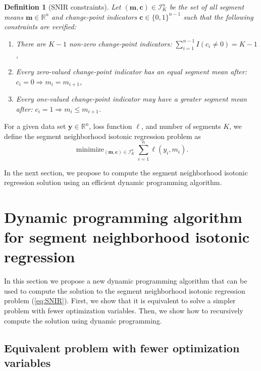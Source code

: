 \documentclass{article}
\newtheorem{definition}{Definition}
\DeclareMathOperator*{\minimize}{minimize}
\newcommand{\RR}{\mathbb R}
\begin{document}
\begin{definition}[SNIR constraints]
  \label{def:I}
  Let $(\mathbf m, \mathbf c)\in\mathcal I_K^n$ be the set of all segment means
  $\mathbf m\in\RR^n$ and change-point indicators
  $\mathbf c\in\{0,1\}^{n-1}$ such that the following constraints are
  verified:
  \begin{enumerate}
  \item There are $K-1$ non-zero change-point indicators:
    $\sum_{i=1}^{n-1} I(c_i \neq 0) = K-1$,
  \item Every zero-valued change-point indicator has an equal segment mean
  after: $c_i = 0 \Rightarrow m_i = m_{i+1}$, 
  \item Every one-valued
    change-point indicator may have a greater segment mean after:
    $c_i = 1 \Rightarrow m_i \leq m_{i+1}$.
  \end{enumerate}
\end{definition}

For a given data set $\mathbf y\in\RR^n$, loss function $\ell$, and
number of segments $K$, we define the segment neighborhood isotonic regression
problem as
\begin{equation}
  \label{eq:SNIR}
  \minimize_{(\mathbf m, \mathbf c)\in\mathcal I_K^n} \sum_{i=1}^n \ell(y_i, m_i).
\end{equation}

In the next section, we propose to compute the segment neighborhood isotonic regression solution
using an efficient dynamic programming algorithm.

\newcommand{\FCC}{C}
\newcommand{\M}{\mathcal{M}}
\section{Dynamic programming algorithm for segment neighborhood isotonic regression}

In this section we propose a new dynamic programming algorithm that
can be used to compute the solution to the segment neighborhood isotonic
regression problem (\ref{eq:SNIR}). First, we show
that it is equivalent to solve a simpler problem with fewer
optimization variables. Then, we show how to recursively compute the
solution using dynamic programming.

\subsection{Equivalent problem with fewer optimization 
variables}
\end{document}
